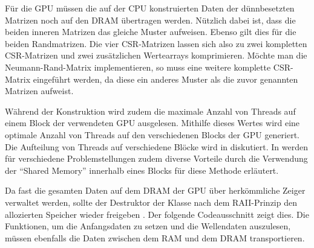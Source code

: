 \documentclass[crop=false,10pt,ngerman]{standalone}
\begin{document}

      Für die GPU müssen die auf der CPU konstruierten Daten der dünnbesetzten Matrizen noch auf den DRAM übertragen werden.
      Nützlich dabei ist, dass die beiden inneren Matrizen das gleiche Muster aufweisen.
      Ebenso gilt dies für die beiden Randmatrizen.
      Die vier CSR-Matrizen lassen sich also zu zwei kompletten CSR-Matrizen und zwei zusätzlichen Wertearrays komprimieren.
      Möchte man die Neumann-Rand-Matrix implementieren, so muss eine weitere komplette CSR-Matrix eingeführt werden, da diese ein anderes Muster als die zuvor genannten Matrizen aufweist.

      Während der Konstruktion wird zudem die maximale Anzahl von Threads auf einem Block der verwendeten GPU ausgelesen.
      Mithilfe dieses Wertes wird eine optimale Anzahl von Threads auf den verschiedenen Blocks der GPU generiert.
      Die Aufteilung von Threads auf verschiedene Blöcke wird in \cite{cuda2018,Kirk2010,Sanders2011} diskutiert.
      In \cite{Bell2008} werden für verschiedene Problemstellungen zudem diverse Vorteile durch die Verwendung der \enquote{Shared Memory} innerhalb eines Blocks für diese Methode erläutert.


      Da fast die gesamten Daten auf dem DRAM der GPU über herkömmliche Zeiger verwaltet werden, sollte der Destruktor der Klasse  nach dem RAII-Prinzip den allozierten Speicher wieder freigeben \cite{Stroustrup2014}.
      Der folgende Codeausschnitt zeigt dies.
      Die Funktionen, um die Anfangsdaten zu setzen und die Wellendaten auszulesen, müssen ebenfalls die Daten zwischen dem RAM und dem DRAM transportieren.


\end{document}
